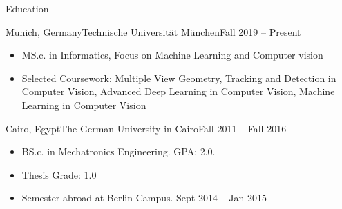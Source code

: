 \documentclass[]{mcdowellcv}
\begin{document}
	\makeheader
	
	\begin{cvsection}{Education}
		\begin{cvsubsection}{Munich, Germany}{Technische Universität München}{Fall 2019 -- Present}
			\begin{itemize}
				\item MS.c. in Informatics, Focus on Machine Learning and Computer vision
				\item Selected Coursework: Multiple View Geometry, Tracking and Detection in Computer Vision, Advanced Deep Learning in Computer Vision, Machine Learning in Computer Vision
			\end{itemize}
		\end{cvsubsection}
		\begin{cvsubsection}{Cairo, Egypt}{The German University in Cairo}{Fall 2011 -- Fall 2016}
			\begin{itemize}
				\item BS.c. in Mechatronics Engineering. GPA: 2.0.
				\item Thesis Grade: 1.0
				\item Semester abroad at Berlin Campus. Sept 2014 -- Jan 2015
			\end{itemize}
		\end{cvsubsection}
	\end{cvsection}
	
\end{document}
